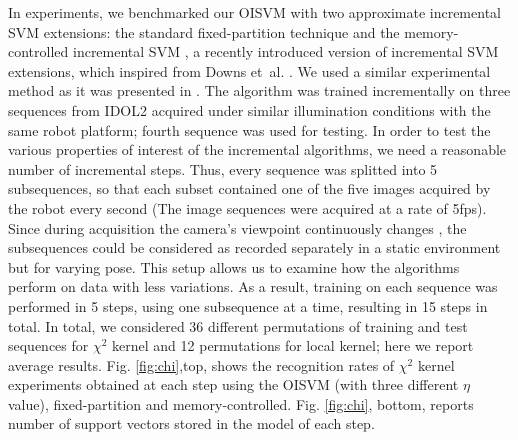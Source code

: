 In experiments, we benchmarked our OISVM with two approximate incremental SVM extensions:
the standard fixed-partition technique \cite{ijcai99} and the memory-controlled incremental
SVM \cite{luo:icra07}, a recently introduced version of incremental SVM
extensions, which inspired from Downs et~al. \cite{DownsGM01}. We used a similar experimental
method as it was presented in \cite{luo:icra07}. The algorithm was trained incrementally on
three sequences from IDOL2 acquired under similar illumination conditions with the same robot
platform; fourth sequence was used for testing. In order to test the various properties of
interest of the incremental algorithms, we need a reasonable number of incremental steps.
Thus, every sequence was splitted into 5 subsequences, so that each subset contained one of the
five images acquired by the robot every second (The image sequences were acquired at a rate of
5fps). Since during acquisition the camera's viewpoint continuously changes \cite{luo:icra07},
the subsequences could be considered as recorded separately in a static environment but for
varying pose. This setup allows us to examine how the algorithms perform on data with less
variations. As a result, training on each sequence was performed in 5 steps, using one subsequence
at a time, resulting in 15 steps in total. In total, we considered 36 different permutations
of training and test sequences for $\chi^2$ kernel and 12 permutations for local kernel; here
we report average results. Fig. \ref{fig:chi},top, shows the recognition rates of $\chi^2$ kernel experiments
obtained at each step using the OISVM (with three different $\eta$ value), fixed-partition and
memory-controlled. Fig. \ref{fig:chi}, bottom, reports number of support vectors stored in the model of
each step.

